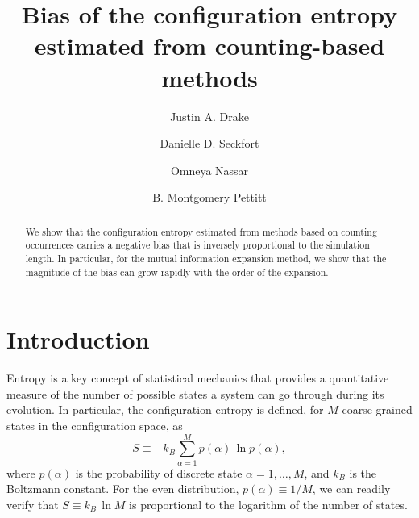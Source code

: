 \documentclass[reprint, superscriptaddress]{revtex4-1}
\begin{document}
\title{Bias of the configuration entropy estimated from counting-based methods}

\author{Justin A. Drake}
\author{Danielle D. Seckfort}
\author{Omneya Nassar}
\author{B. Montgomery Pettitt}

\begin{abstract}
We show that the configuration entropy estimated from methods based on counting occurrences
carries a negative bias
that is inversely proportional to the simulation length.
%
In particular, for the mutual information expansion method,
we show that the magnitude of the bias can grow rapidly with the order of the expansion.
\end{abstract}

\maketitle


\section{Introduction}

Entropy is a key concept of statistical mechanics that provides a quantitative measure of
the number of possible states a system can go through during its evolution.
%
In particular, the configuration entropy is defined,
for $M$ coarse-grained states in the configuration space, as
%
\begin{equation}
  S
  \equiv
  -k_B \sum_{\alpha = 1}^M p(\alpha) \, \ln p(\alpha)
  ,
  \label{eq:entropy_def}
\end{equation}
%
where $p(\alpha)$ is the probability of discrete state $\alpha = 1, \dots, M$,
and $k_B$ is the Boltzmann constant.
%
For the even distribution, $p(\alpha) \equiv 1/M$,
we can readily verify that $S \equiv k_B \, \ln M$
is proportional to the logarithm of the number of states.
\end{document}
